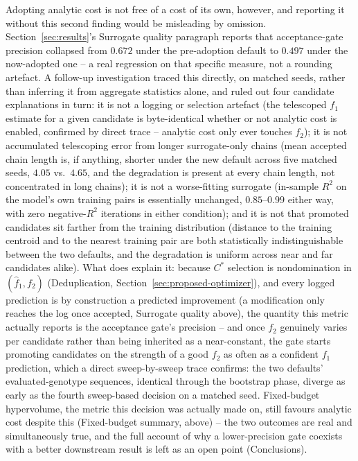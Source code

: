 Adopting analytic cost is not free of a cost of its own, however, and reporting it without this second
finding would be misleading by omission. Section~\ref{sec:results}'s Surrogate quality paragraph reports
that acceptance-gate precision collapsed from $0.672$ under the pre-adoption default to $0.497$ under the
now-adopted one -- a real regression on that specific measure, not a rounding artefact. A follow-up
investigation traced this directly, on matched seeds, rather than inferring it from aggregate statistics
alone, and ruled out four candidate explanations in turn: it is not a logging or selection artefact (the
telescoped $f_1$ estimate for a given candidate is byte-identical whether or not analytic cost is enabled,
confirmed by direct trace -- analytic cost only ever touches $f_2$); it is not accumulated telescoping error
from longer surrogate-only chains (mean accepted chain length is, if anything, shorter under the new default
across five matched seeds, $4.05$ vs.\ $4.65$, and the degradation is present at every chain length, not
concentrated in long chains); it is not a worse-fitting surrogate (in-sample $R^2$ on the model's own
training pairs is essentially unchanged, $0.85$--$0.99$ either way, with zero negative-$R^2$ iterations in
either condition); and it is not that promoted candidates sit farther from the training distribution
(distance to the training centroid and to the nearest training pair are both statistically indistinguishable
between the two defaults, and the degradation is uniform across near and far candidates alike). What does
explain it: because $C^*$ selection is nondomination in $(\hat{f}_1, f_2)$ (Deduplication,
Section~\ref{sec:proposed-optimizer}), and every logged prediction is by construction a predicted
improvement (a modification only reaches the log once accepted, Surrogate quality above), the quantity this
metric actually reports is the acceptance gate's precision -- and once $f_2$ genuinely varies per candidate
rather than being inherited as a near-constant, the gate starts promoting candidates on the strength of a
good $f_2$ as often as a confident $f_1$ prediction, which a direct sweep-by-sweep trace confirms: the two
defaults' evaluated-genotype sequences, identical through the bootstrap phase, diverge as early as the
fourth sweep-based decision on a matched seed. Fixed-budget hypervolume, the metric this decision was
actually made on, still favours analytic cost despite this (Fixed-budget summary, above) -- the two
outcomes are real and simultaneously true, and the full account of why a lower-precision gate coexists with
a better downstream result is left as an open point (Conclusions).


